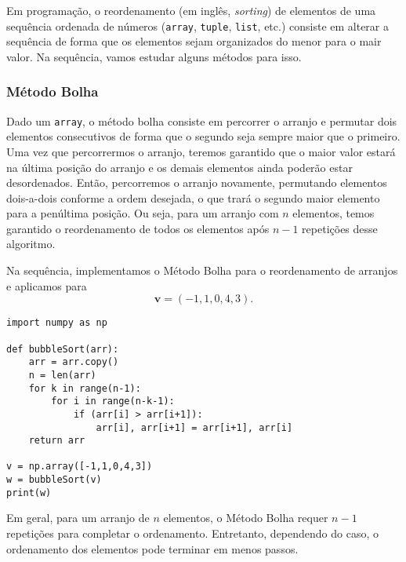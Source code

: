 Em programação, o reordenamento (em inglês, \textit{sorting}) de elementos de uma sequência ordenada de números (\lstinline+array+, \lstinline+tuple+, \lstinline+list+, etc.) consiste em alterar a sequência de forma que os elementos sejam organizados do menor para o mair valor. Na sequência, vamos estudar alguns métodos para isso.

\subsubsection{Método Bolha}

Dado um \lstinline+array+, o método bolha consiste em percorrer o arranjo e permutar dois elementos consecutivos de forma que o segundo seja sempre maior que o primeiro. Uma vez que percorrermos o arranjo, teremos garantido que o maior valor estará na última posição do arranjo e os demais elementos ainda poderão estar desordenados. Então, percorremos o arranjo novamente, permutando elementos dois-a-dois conforme a ordem desejada, o que trará o segundo maior elemento para a penúltima posição. Ou seja, para um arranjo com $n$ elementos, temos garantido o reordenamento de todos os elementos após $n-1$ repetições desse algoritmo.

\begin{ex}
  Na sequência, implementamos o Método Bolha para o reordenamento de arranjos e aplicamos para
  \begin{equation}
    \pmb{v} = (-1, 1, 0, 4, 3).
  \end{equation}
  
\begin{lstlisting}[caption=bubbleSort\_v1.py]
import numpy as np

def bubbleSort(arr):
    arr = arr.copy()
    n = len(arr)
    for k in range(n-1):
        for i in range(n-k-1):
            if (arr[i] > arr[i+1]):
                arr[i], arr[i+1] = arr[i+1], arr[i]
    return arr

v = np.array([-1,1,0,4,3])
w = bubbleSort(v)
print(w)
\end{lstlisting}

\end{ex}

\begin{obs}
  Em geral, para um arranjo de $n$ elementos, o Método Bolha requer $n-1$ repetições para completar o ordenamento. Entretanto, dependendo do caso, o ordenamento dos elementos pode terminar em menos passos.
\end{obs}

